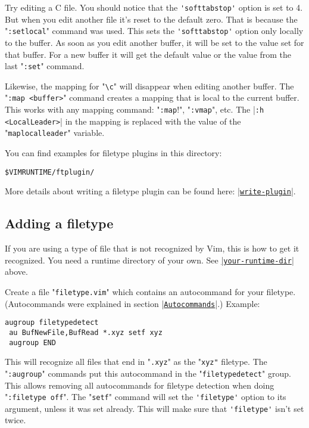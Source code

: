 Try editing a C file.
You should notice that the \verb!'softtabstop'! option is set to 4.
But when you edit another file it's reset to the default zero.
That is because the "\verb!:setlocal!" command was used.
This sets the \verb!'softtabstop'! option only locally to the buffer.
As soon as you edit another buffer, it will be set to the value set for that buffer.
For a new buffer it will get the default value or the value from the last "\verb!:set!" command.

Likewise, the mapping for "\verb!\c!" will disappear when editing another buffer.
The "\verb!:map <buffer>!" command creates a mapping that is local to the current buffer.
This works with any mapping command: "\verb!:map!!", "\verb!:vmap!", etc.
The |\verb!:h <LocalLeader>!| in the mapping is replaced with the value of the "\verb!maplocalleader!" variable.

You can find examples for filetype plugins in this directory:

\begin{Verbatim}[samepage=true]
 $VIMRUNTIME/ftplugin/
\end{Verbatim}

More details about writing a filetype plugin can be found here: \hyperref[write-plugin]{|\texttt{write-plugin}|}.
\subsection{Adding a filetype}
\label{Adding a filetype}
If you are using a type of file that is not recognized by Vim, this is how to get it recognized.
You need a runtime directory of your own.
See \hyperref[your-runtime-dir]{|\texttt{your-runtime-dir}|} above.

Create a file "\verb!filetype.vim!" which contains an autocommand for your filetype.
(Autocommands were explained in section |\hyperref[Autocommands]{\texttt{Autocommands}}|.)
Example:

\begin{Verbatim}[samepage=true]
 augroup filetypedetect
 au BufNewFile,BufRead *.xyz setf xyz
 augroup END
\end{Verbatim}

This will recognize all files that end in "\verb!.xyz!" as the "\verb!xyz"! filetype.
The "\verb!:augroup!" commands put this autocommand in the "\verb!filetypedetect!" group.
This allows removing all autocommands for filetype detection when doing "\verb!:filetype off!".
The "\verb!setf!" command will set the \verb!'filetype'! option to its argument, unless it was set already.
This will make sure that \verb!'filetype'! isn't set twice.

